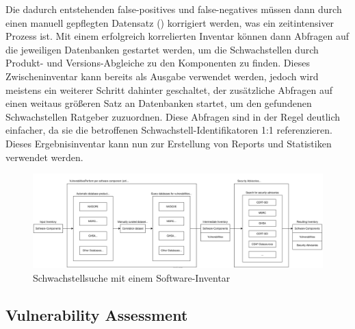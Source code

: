 Die dadurch entstehenden false-positives und false-negatives müssen dann durch einen manuell gepflegten Datensatz () korrigiert werden, was ein zeitintensiver Prozess ist.
Mit einem erfolgreich korrelierten Inventar können dann Abfragen auf die jeweiligen Datenbanken gestartet werden, um die Schwachstellen durch Produkt- und Versions-Abgleiche zu den Komponenten zu finden.
Dieses Zwischeninventar kann bereits als Ausgabe verwendet werden, jedoch wird meistens ein weiterer Schritt dahinter geschaltet, der zusätzliche Abfragen auf einen weitaus größeren Satz an Datenbanken startet, um den gefundenen Schwachstellen Ratgeber zuzuordnen.
Diese Abfragen sind in der Regel deutlich einfacher, da sie die betroffenen Schwachstell-Identifikatoren 1:1 referenzieren.
Dieses Ergebnisinventar kann nun zur Erstellung von Reports und Statistiken verwendet werden.

\begin{figure}[htbp] %
    \centering
    \includegraphics[width=1\textwidth, keepaspectratio]{res/grafiken/vulnerability-monitoring-overview.svg}
    \caption{Schwachstellsuche mit einem Software-Inventar}
    \label{fig:vulnerability-monitoring-overview-figure}
\end{figure}

\subsection{Vulnerability Assessment} \label{subsec:projektbericht-grundlagen-vulnerability-assessment}
